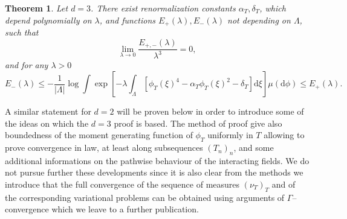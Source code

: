 \documentclass[11pt, oneside]{article}   	%
\newcommand{\mathd}{\mathrm{d}}
\newtheorem{theorem}{Theorem}
\begin{document}
\begin{theorem}
  \label{th:main-3d}Let $d = 3$. There exist renormalization constants
  $\alpha_T, \delta_T$, which depend polynomially on $\lambda$, and functions
  $E_+ (\lambda), E_- (\lambda)$ not depending on $\Lambda$, such that
  \[ \lim_{\lambda \rightarrow 0} \frac{E_{+, -} (\lambda)}{\lambda^3} = 0,
  \]
  and for any $\lambda > 0$
  \[ E_- (\lambda) \leqslant - \frac{1}{| \Lambda |} \log \int \exp \left[ -
     \lambda \int_{\Lambda} [\phi_T (\xi)^4 - \alpha_T \phi_T (\xi)^2 -
     \delta_T] \mathd \xi \right] \mu (\mathd \phi) \leqslant E_+ (\lambda) .
  \]
\end{theorem}

A similar statement for $d = 2$ will be proven below in order to introduce
some of the ideas on which the $d = 3$ proof is based. The method of proof
give also boundedness of the moment generating function of $\phi_T$ uniformly
in $T$ allowing to prove convergence in law, at least along subsequences
$(T_n)_n$, and some additional informations on the pathwise behaviour of the
interacting fields. We do not pursue further these developments since it is
also clear from the methods we introduce that the full convergence of the
sequence of measures $(\nu_T)_T$ and of the corresponding variational problems
can be obtained using arguments of $\Gamma$--convergence which we leave to a
further publication.

\
\end{document}

